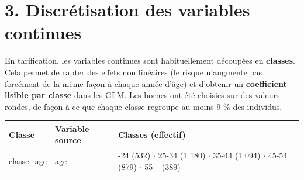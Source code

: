 \documentclass[

  french,

  10pt,

  a4paper,

]{article}
\newcounter{none} %
\begin{document}
\section{3. Discrétisation des variables continues}



En tarification, les variables continues sont habituellement découpées en \textbf{classes}. Cela permet de capter des effets non linéaires (le risque n'augmente pas forcément de la même façon à chaque année d'âge) et d'obtenir un \textbf{coefficient lisible par classe} dans les GLM. Les bornes ont été choisies sur des valeurs rondes, de façon à ce que chaque classe regroupe au moins 9 \% des individus.



{\def\LTcaptype{none} %

\begin{longtable}[]{@{}

  >{\raggedright\arraybackslash}p{}

  >{\raggedright\arraybackslash}p{}

  >{\raggedright\arraybackslash}p{}@{}}

\toprule\noalign{}

\begin{minipage}[b]{\linewidth}\raggedright

Classe

\end{minipage} & \begin{minipage}[b]{\linewidth}\raggedright

Variable source

\end{minipage} & \begin{minipage}[b]{\linewidth}\raggedright

Classes (effectif)

\end{minipage} \\

\midrule\noalign{}

\endhead

\bottomrule\noalign{}

\endlastfoot

classe\_age & age & 18-24 (532) \ensuremath{\cdot} 25-34 (1 180) \ensuremath{\cdot} 35-44 (1 094) \ensuremath{\cdot} 45-54 (879) \ensuremath{\cdot} 55+ (389) \\


\end{longtable}}
\end{document}
